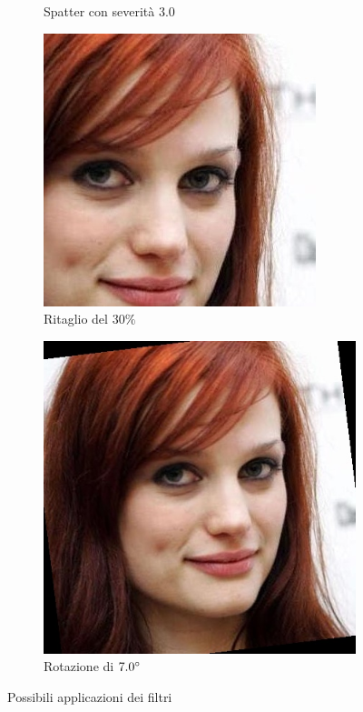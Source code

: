 \begin{figure}[ht]
\begin{subfigure}{0.2\textwidth}
\caption{Spatter con severità $3.0$}
\label{sfig:corruption_spatter}
\end{subfigure}\hfill
\begin{subfigure}{0.2\textwidth}
\includegraphics[width=\textwidth]{./Images/random_crop_severity_0.3.jpg}
\caption{Ritaglio del $30\%$}
\label{sfig:corruption_random_crop}
\end{subfigure}\hfill
\begin{subfigure}{0.2\textwidth}
\includegraphics[width=\textwidth]{./Images/rotation_severity_7.0.jpg}
\caption{Rotazione di $7.0 \degree$}
\label{sfig:corruption_rotation}
\end{subfigure}\hfill
\caption{Possibili applicazioni dei filtri}
\label{sfig:data_augmentation}
\end{figure}

